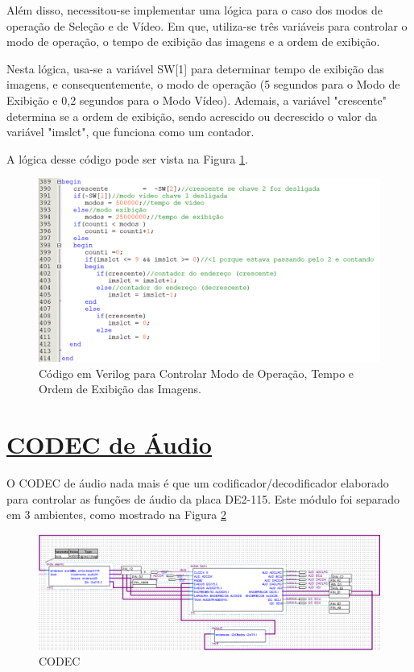 \documentclass[14pt, oneside]{book}
\newcommand\tab[1][1cm]{\hspace*{#1}}
\theoremstyle{definition}
\begin{document}
            \tab Além disso, necessitou-se implementar uma lógica para o caso dos modos de operação de Seleção e de Vídeo. Em que, utiliza-se três variáveis para controlar o modo de operação, o tempo de exibição das imagens e a ordem de exibição. 
            
            \tab Nesta lógica, usa-se a variável SW[1] para determinar tempo de exibição das imagens, e consequentemente, o modo de operação (5 segundos para o Modo de Exibição e 0,2 segundos para o Modo Vídeo). Ademais, a variável "crescente" determina se a ordem de exibição, sendo acrescido ou decrescido o valor da variável "imslct", que funciona como um contador.
            
            \tab A lógica desse código pode ser vista na Figura \ref{logica modo}.
            
                \begin{figure}[H]
                    \centering
                    \includegraphics[scale=0.7]{logica_modo.PNG}
                    \caption{Código em Verilog para Controlar Modo de Operação, Tempo e Ordem de Exibição das Imagens.}
                    \label{logica modo}
                \end{figure}
            
            \section[CODEC de Áudio]{\hyperlink{toc}{CODEC de Áudio}}
                O CODEC de áudio nada mais é que um codificador/decodificador elaborado para controlar as funções de áudio da placa DE2-115. Este módulo foi separado em 3 ambientes, como mostrado na Figura \ref{fig:codec}
                
                \begin{figure}[!h]
                        \centering
                        \includegraphics[scale=0.7]{codec.png}
                        \caption{CODEC}
                        \label{fig:codec}
                    \end{figure}
                
\end{document}
